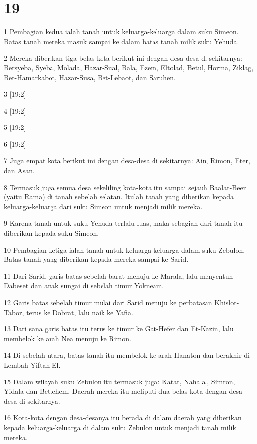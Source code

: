 \chapter{19}

\par 1 Pembagian kedua ialah tanah untuk keluarga-keluarga dalam suku Simeon. Batas tanah mereka masuk sampai ke dalam batas tanah milik suku Yehuda.
\par 2 Mereka diberikan tiga belas kota berikut ini dengan desa-desa di sekitarnya: Bersyeba, Syeba, Molada, Hazar-Sual, Bala, Ezem, Eltolad, Betul, Horma, Ziklag, Bet-Hamarkabot, Hazar-Susa, Bet-Lebaot, dan Saruhen.
\par 3 [19:2]
\par 4 [19:2]
\par 5 [19:2]
\par 6 [19:2]
\par 7 Juga empat kota berikut ini dengan desa-desa di sekitarnya: Ain, Rimon, Eter, dan Asan.
\par 8 Termasuk juga semua desa sekeliling kota-kota itu sampai sejauh Baalat-Beer (yaitu Rama) di tanah sebelah selatan. Itulah tanah yang diberikan kepada keluarga-keluarga dari suku Simeon untuk menjadi milik mereka.
\par 9 Karena tanah untuk suku Yehuda terlalu luas, maka sebagian dari tanah itu diberikan kepada suku Simeon.
\par 10 Pembagian ketiga ialah tanah untuk keluarga-keluarga dalam suku Zebulon. Batas tanah yang diberikan kepada mereka sampai ke Sarid.
\par 11 Dari Sarid, garis batas sebelah barat menuju ke Marala, lalu menyentuh Dabeset dan anak sungai di sebelah timur Yokneam.
\par 12 Garis batas sebelah timur mulai dari Sarid menuju ke perbatasan Khislot-Tabor, terus ke Dobrat, lalu naik ke Yafia.
\par 13 Dari sana garis batas itu terus ke timur ke Gat-Hefer dan Et-Kazin, lalu membelok ke arah Nea menuju ke Rimon.
\par 14 Di sebelah utara, batas tanah itu membelok ke arah Hanaton dan berakhir di Lembah Yiftah-El.
\par 15 Dalam wilayah suku Zebulon itu termasuk juga: Katat, Nahalal, Simron, Yidala dan Betlehem. Daerah mereka itu meliputi dua belas kota dengan desa-desa di sekitarnya.
\par 16 Kota-kota dengan desa-desanya itu berada di dalam daerah yang diberikan kepada keluarga-keluarga di dalam suku Zebulon untuk menjadi tanah milik mereka.

